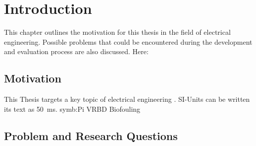 \documentclass[class=scrbook, crop=false]{standalone}
\begin{document}
\chapter{Introduction}
\label{Chapter::Introduction}
    This chapter outlines the motivation for this thesis in the field of electrical engineering. Possible problems that could be encountered during the development and evaluation process are also discussed. Here: 

\section{Motivation}
\label{Section::Motivation}
    This Thesis targets a key topic of electrical engineering \cite{Piezoelectirc_Sensors_and_Actors}. SI-Units can be written its text as \SI{50}{\ms}. \gls{symb:Pi} \gls{VRBD} \gls{Biofouling}

\section{Problem and Research Questions}
\label{Section::Problem_and_Research_Questions}
    \Blindtext

\ifstandalone
    \printglossary
    \printbibliography[heading=bibintoc]
\fi
\end{document}
